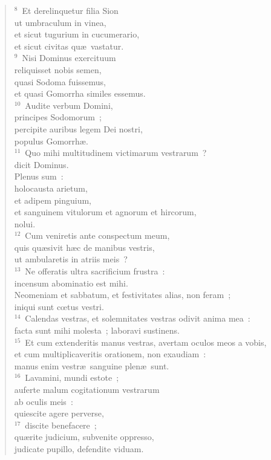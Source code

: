 \begin{flushleft}
\begin{verse}
${}^{8}$~Et derelinquetur filia Sion\\ ut umbraculum in vinea,\\ et sicut tugurium in cucumerario,\\ et sicut civitas qu\ae\ vastatur.\\
${}^{9}$~Nisi Dominus exercituum\\ reliquisset nobis semen,\\ quasi Sodoma fuissemus,\\ et quasi Gomorrha similes essemus.\\
${}^{10}$~Audite verbum Domini,\\ principes Sodomorum~;\\ percipite auribus legem Dei nostri,\\ populus Gomorrh\ae .\\
${}^{11}$~Quo mihi multitudinem victimarum vestrarum~?\\ dicit Dominus.\\ Plenus sum~:\\ holocausta arietum,\\ et adipem pinguium,\\ et sanguinem vitulorum et agnorum et hircorum,\\ nolui.\\
${}^{12}$~Cum veniretis ante conspectum meum,\\ quis qu\ae sivit h\ae c de manibus vestris,\\ ut ambularetis in atriis meis~?\\
${}^{13}$~Ne offeratis ultra sacrificium frustra~:\\ incensum abominatio est mihi.\\ Neomeniam et sabbatum, et festivitates alias, non feram~;\\ iniqui sunt cœtus vestri.\\
${}^{14}$~Calendas vestras, et solemnitates vestras odivit anima mea~:\\ facta sunt mihi molesta~; laboravi sustinens.\\
${}^{15}$~Et cum extenderitis manus vestras, avertam oculos meos a vobis,\\ et cum multiplicaveritis orationem, non exaudiam~:\\ manus enim vestr\ae\ sanguine plen\ae\ sunt.\\
${}^{16}$~Lavamini, mundi estote~;\\ auferte malum cogitationum vestrarum\\ ab oculis meis~:\\ quiescite agere perverse,\\
${}^{17}$~discite benefacere~;\\ qu\ae rite judicium, subvenite oppresso,\\ judicate pupillo, defendite viduam.\end{verse}\end{flushleft}


